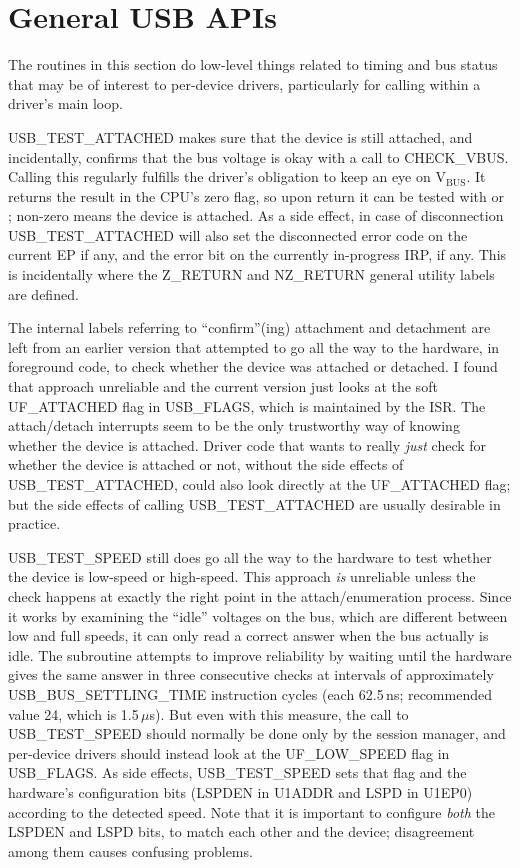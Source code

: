 \section{General USB APIs}

The routines in this section do low-level things related to timing and bus
status that may be of interest to per-device drivers, particularly for
calling within a driver's main loop.

USB\_TEST\_ATTACHED makes sure that the device is still attached, and
incidentally, confirms that the bus voltage is okay with a call to
CHECK\_VBUS.  Calling this regularly fulfills the driver's obligation to
keep an eye on V$_\textrm{BUS}$.  It returns the result in the CPU's zero
flag, so upon return it can be tested with  or ;
non-zero means the device is attached.  As a side effect, in case of
disconnection USB\_TEST\_ATTACHED will also set the disconnected error code
on the current EP if any, and the error bit on the currently in-progress
IRP, if any.  This is incidentally where the Z\_RETURN and NZ\_RETURN
general utility labels are defined.

The internal labels referring to ``confirm''(ing) attachment and detachment
are left from an earlier version that attempted to go all the way to the
hardware, in foreground code, to check whether the device was attached or
detached.  I found that approach unreliable and the current version just
looks at the soft UF\_ATTACHED flag in USB\_FLAGS, which is maintained by
the ISR.  The attach/detach interrupts seem to be the only trustworthy way
of knowing whether the device is attached.  Driver code that wants to really
\emph{just} check for whether the device is attached or not, without the
side effects of USB\_TEST\_ATTACHED, could also look directly at the
UF\_ATTACHED flag; but the side effects of calling USB\_TEST\_ATTACHED are
usually desirable in practice.

USB\_TEST\_SPEED still does go all the way to the hardware to test whether
the device is low-speed or high-speed.  This approach \emph{is} unreliable
unless the check happens at exactly the right point in the
attach/enumeration process.  Since it works by examining the ``idle''
voltages on the bus, which are different between low and full speeds, it can
only read a correct answer when the bus actually is idle.  The subroutine
attempts to improve reliability by waiting until the hardware gives the same
answer in three consecutive checks at intervals of approximately
USB\_BUS\_SETTLING\_TIME instruction cycles (each 62.5\,ns; recommended value
24, which is 1.5\,$\mu$s).  But even with this measure, the call to
USB\_TEST\_SPEED should normally be done only by the session manager, and
per-device drivers should instead look at the UF\_LOW\_SPEED flag in
USB\_FLAGS.  As side effects, USB\_TEST\_SPEED sets that flag and the
hardware's configuration bits (LSPDEN in U1ADDR and LSPD in U1EP0) according
to the detected speed.  Note that it is important to configure \emph{both}
the LSPDEN and LSPD bits, to match each other and the device; disagreement
among them causes confusing problems.


